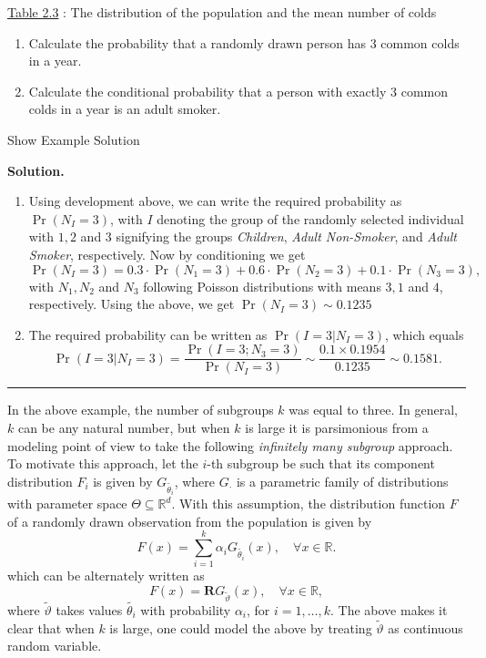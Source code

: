 \documentclass[]{book}
\providecommand{\tightlist}{%
  \setlength{\itemsep}{0pt}\setlength{\parskip}{0pt}}
\theoremstyle{definition}
\theoremstyle{definition}
\theoremstyle{definition}
\theoremstyle{remark}
\begin{document}
\protect\hyperlink{tab:2.3}{Table 2.3} : The distribution of the
population and the mean number of colds

\begin{enumerate}
\def\labelenumi{\arabic{enumi}.}
\tightlist
\item
  Calculate the probability that a randomly drawn person has 3 common
  colds in a year.
\item
  Calculate the conditional probability that a person with exactly 3
  common colds in a year is an adult smoker.
\end{enumerate}

Show Example Solution

\hypertarget{toggleExampleFreq.6.1}{}
\textbf{Solution.}

\begin{enumerate}
\def\labelenumi{\arabic{enumi}.}
\tightlist
\item
  Using development above, we can write the required probability as
  \(\Pr(N_I=3)\), with \(I\) denoting the group of the randomly selected
  individual with \(1,2\) and \(3\) signifying the groups
  \emph{Children}, \emph{Adult Non-Smoker}, and \emph{Adult Smoker},
  respectively. Now by conditioning we get \[
  \Pr(N_I=3)=0.3\cdot\Pr(N_1=3)+0.6\cdot\Pr(N_2=3)+0.1\cdot\Pr(N_3=3),
  \] with \(N_1,N_2\) and \(N_3\) following Poisson distributions with
  means \(3,1\) and \(4\), respectively. Using the above, we get
  \(\Pr(N_I=3)\sim0.1235\)
\item
  The required probability can be written as \(\Pr(I=3\vert N_I=3)\),
  which equals \[
  \Pr(I=3\vert N_I=3)=\frac{\Pr(I=3;N_3=3)}{\Pr(N_I=3)}\sim\frac{0.1 \times 0.1954}{0.1235}\sim 0.1581.
  \]
\end{enumerate}

\begin{center}\rule{0.5\linewidth}{\linethickness}\end{center}

In the above example, the number of subgroups \(k\) was equal to three.
In general, \(k\) can be any natural number, but when \(k\) is large it
is parsimonious from a modeling point of view to take the following
\emph{infinitely many subgroup} approach. To motivate this approach, let
the \(i\)-th subgroup be such that its component distribution \(F_i\) is
given by \(G_{\tilde{\theta_i}}\), where \(G_\cdot\) is a parametric
family of distributions with parameter space
\(\Theta\subseteq \mathbb{R}^d\). With this assumption, the distribution
function \(F\) of a randomly drawn observation from the population is
given by \[
F(x)=\sum_{i=1}^k \alpha_i G_{\tilde{\theta_i}}(x),\quad \forall x\in\mathbb{R}.
\] which can be alternately written as\\
\[
F(x)=\mathbf{R}{G_{\tilde{\vartheta}}(x)},\quad \forall x\in\mathbb{R},
\] where \(\tilde{\vartheta}\) takes values \(\tilde{\theta_i}\) with
probability \(\alpha_i\), for \(i=1,\ldots,k\). The above makes it clear
that when \(k\) is large, one could model the above by treating
\(\tilde{\vartheta}\) as continuous random variable.
\end{document}
